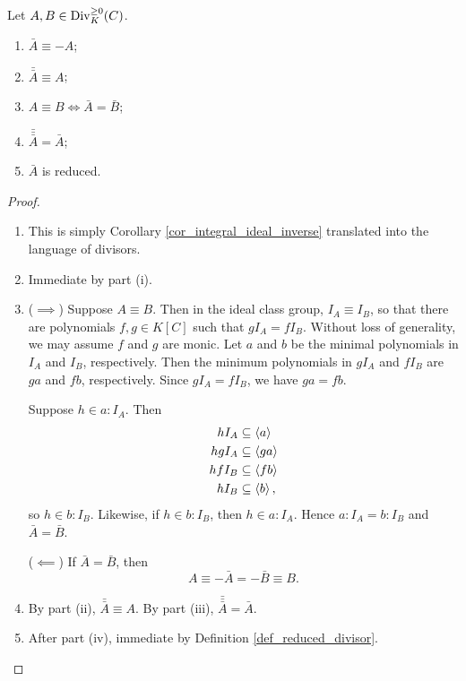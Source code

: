 \begin{proposition}
  \label{prop_flip_properties}
  Let $A, B \in \operatorname{Div}_K^{\geq 0}(C)$.
  \begin{enumerate}[label=(\roman*)]
    \item $\bar A \equiv -A$;
    \item $\bar{\bar A} \equiv A$;
    \item $A \equiv B \iff \bar A = \bar B$;
    \item $\bar{\bar{\bar A}} = \bar A$;
    \item $\bar A$ is reduced.
  \end{enumerate}
\end{proposition}
\begin{proof}
  \begin{enumerate}[label=(\roman*)]
    \item This is simply Corollary \ref{cor_integral_ideal_inverse} translated into the language of divisors.
    \item Immediate by part (i).
    \item
      ($\implies$)
      Suppose $A \equiv B$.
      Then in the ideal class group, $I_A \equiv I_B$,
      so that there are polynomials $f, g \in K[C]$ such that $gI_A = fI_B$.
      Without loss of generality, we may assume $f$ and $g$ are monic.
      Let $a$ and $b$ be the minimal polynomials  in $I_A$ and $I_B$, respectively.
      Then the minimum polynomials  in $gI_A$ and $fI_B$ are $ga$ and $fb$, respectively.
      Since $gI_A = fI_B$, we have $ga = fb$.
      
      Suppose $h \in a : I_A$. Then
      \begin{align*}
        hI_A &\subseteq \left\langle a \right\rangle \\
        hgI_A &\subseteq \left\langle ga \right\rangle \\
        hfI_B &\subseteq \left\langle fb \right\rangle \\
        hI_B &\subseteq \left\langle b \right\rangle,
      \end{align*}
      so $h \in b : I_B$.
      Likewise, if $h \in b : I_B$, then $h \in a : I_A$.
      Hence $a : I_A = b : I_B$ and $\bar A = \bar B$.
      
      ($\impliedby$)
      If $\bar A = \bar B$, then
      \[ A \equiv - \bar A = - \bar B \equiv B. \]
    \item By part (ii), $\bar{\bar A} \equiv A$.
          By part (iii), $\bar{\bar{\bar A}} = \bar A$.
    \item After part (iv), immediate by Definition \ref{def_reduced_divisor}.
  \end{enumerate}
\end{proof}

